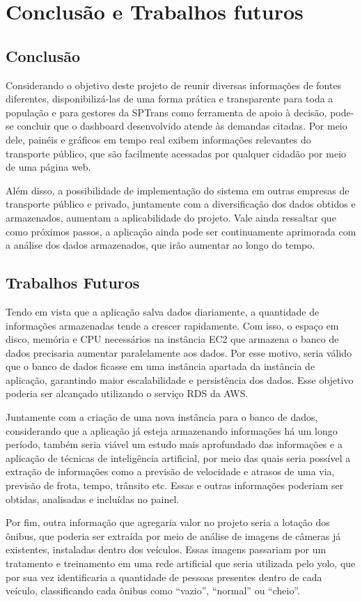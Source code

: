 \chapter{Conclusão e Trabalhos futuros}
\label{Cap:Conclusoes}

\section{Conclusão}
\indent
\par Considerando o objetivo deste projeto de reunir diversas informações de fontes diferentes, disponibilizá-las de uma forma prática e transparente para toda a população e para gestores da SPTrans como ferramenta de apoio à decisão, pode-se concluir que o dashboard desenvolvido atende às demandas citadas. Por meio dele, painéis e gráficos em tempo real exibem informações relevantes do transporte público, que são facilmente acessadas por qualquer cidadão por meio de uma página web.
\indent
\par Além disso, a possibilidade de implementação do sistema em outras empresas de transporte público e privado, juntamente com a diversificação dos dados obtidos e armazenados, aumentam a aplicabilidade do projeto. Vale ainda ressaltar que como próximos passos, a aplicação ainda pode ser continuamente aprimorada com a análise dos dados armazenados, que irão aumentar ao longo do tempo.
\section{Trabalhos Futuros}
\indent
\par Tendo em vista que a aplicação salva dados diariamente, a quantidade de informações armazenadas tende a crescer rapidamente. Com isso, o espaço em disco, memória e CPU necessários na instância EC2 que armazena o banco de dados precisaria aumentar paralelamente aos dados. Por esse motivo, seria válido que o banco de dados ficasse em uma instância apartada da instância de aplicação, garantindo maior escalabilidade e persistência dos dados. Esse objetivo poderia ser alcançado utilizando o serviço RDS da AWS.
\indent
\par Juntamente com a criação de uma nova instância para o banco de dados, considerando que a aplicação já esteja armazenando informações há um longo período, também seria viável um estudo mais aprofundado das informações e a aplicação de técnicas de inteligência artificial, por meio das quais seria possível a extração de informações como a previsão de velocidade e atrasos de uma via, previsão de frota, tempo, trânsito etc. Essas e outras informações poderiam ser obtidas, analisadas e incluídas no painel.
\indent
\par Por fim, outra informação que agregaria valor no projeto seria a lotação dos ônibus, que poderia ser extraída por meio de análise de imagens de câmeras já existentes, instaladas dentro dos veículos. Essas imagens passariam por um tratamento e treinamento em uma rede artificial que seria utilizada pelo yolo, que por sua vez identificaria a quantidade de pessoas presentes dentro de cada veículo, classificando cada ônibus como “vazio”, “normal” ou “cheio”.




